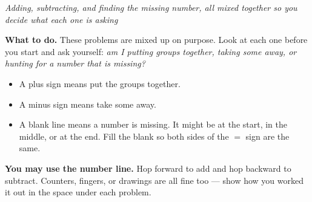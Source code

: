 \documentclass[12pt]{article}
\begin{document}

\begin{center}
\textit{Adding, subtracting, and finding the missing number, all mixed together
so you decide what each one is asking}
\end{center}

\noindent\textbf{What to do.} These problems are mixed up on purpose. Look at
each one before you start and ask yourself: \emph{am I putting groups together,
taking some away, or hunting for a number that is missing?}

\begin{itemize}[leftmargin=1.2cm, itemsep=2pt, topsep=3pt]
\item A plus sign means put the groups together.
\item A minus sign means take some away.
\item A blank line means a number is missing. It might be at the start, in the
middle, or at the end. Fill the blank so both sides of the $=$ sign are the
same.
\end{itemize}

\noindent\textbf{You may use the number line.} Hop forward to add and hop
backward to subtract. Counters, fingers, or drawings are all fine too --- show
how you worked it out in the space under each problem.

\begin{center}
\end{center}







\end{document}

